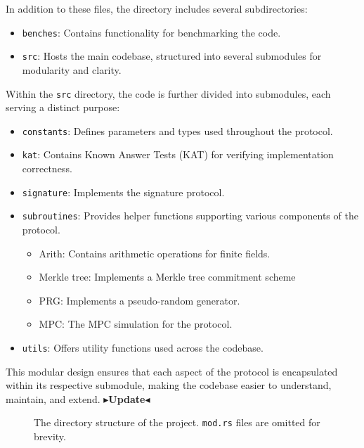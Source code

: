 \documentclass[11pt]{report}
\theoremstyle{definition}
\theoremstyle{plain}
\newcommand{\todo}[1]{{\color[rgb]{.5,0,0}\textbf{$\blacktriangleright$#1$\blacktriangleleft$}}}
\begin{document}
In addition to these files, the directory includes several subdirectories:

\begin{itemize}
  \item \texttt{benches}: Contains functionality for benchmarking the code.
  \item \texttt{src}: Hosts the main codebase, structured into several submodules for modularity and clarity.
\end{itemize}

Within the \texttt{src} directory, the code is further divided into submodules, each serving a distinct purpose:

\begin{itemize}
  \item \texttt{constants}: Defines parameters and types used throughout the protocol.
  \item \texttt{kat}: Contains Known Answer Tests (KAT) for verifying implementation correctness.
  \item \texttt{signature}: Implements the signature protocol.
  \item \texttt{subroutines}: Provides helper functions supporting various components of the protocol.
        \begin{itemize}
          \item Arith: Contains arithmetic operations for finite fields.
          \item Merkle tree: Implements a Merkle tree commitment scheme
          \item PRG: Implements a pseudo-random generator.
          \item MPC: The MPC simulation for the protocol.
        \end{itemize}
  \item \texttt{utils}: Offers utility functions used across the codebase.
\end{itemize}

This modular design ensures that each aspect of the protocol is encapsulated within its respective submodule, making the codebase easier to understand, maintain, and extend. \todo{Update}
\begin{figure}[H]
  \caption{The directory structure of the project. \texttt{mod.rs} files are omitted for brevity.}
  \label{fig:structure}
\end{figure}
\end{document}
